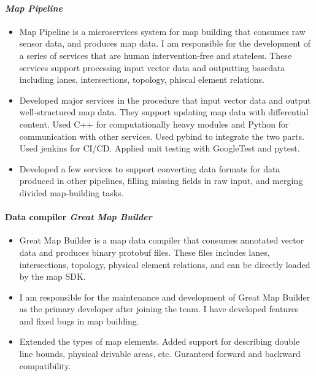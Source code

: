     \paragraph{\textit{Map Pipeline}}
        \begin{itemize}
            \item 
                Map Pipeline is a microservices system for map building
                that consumes raw sensor data, and produces map data.
                I am responsible for the development of a series of services that are
                human intervention-free and stateless.
                These services support processing input vector data 
                and outputting 
                basedata including lanes, intersections, topology, phiscal element relations.
            \item 
                Developed major services in the procedure that input vector data and output well-structured map data.
                They support updating map data with differential content.
                Used C++ for computationally heavy modules
                and Python for communication with other services.
                Used pybind to integrate the two parts.
                Used jenkins for CI/CD.
                Applied unit testing with GoogleTest and pytest.
            \item 
                Developed a few services to support
                converting data formats for data produced in other pipelines,
                filling missing fields in raw input,
                and merging divided map-building tasks.
        \end{itemize}

    \paragraph{Data compiler \textit{Great Map Builder}}
        \begin{itemize}
            \item 
                Great Map Builder is a map data compiler
                that consumes annotated vector data
                and produces binary protobuf files.
                These files includes lanes, intersections, topology, physical element relations, 
                and can be directly loaded by the map SDK.
            \item 
                I am responsible for the maintenance and development of Great Map Builder 
                as the primary developer after joining the team.
                I have developed features and fixed bugs in map building.
            \item 
                Extended the types of map elements.
                Added support for describing double line bounds, physical drivable areas, etc.
                Guranteed forward and backward compatibility.
        \end{itemize}

